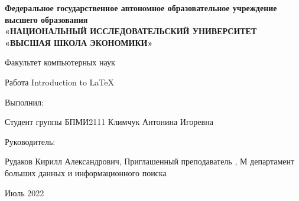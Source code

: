\documentclass{report}
\begin{document}
\begin{titlepage}
    \newpage
    \begin{center}
    {\bfseries Федеральное государственное автономное образовательное учреждение высшего образования  \\
    \vspace{0,5cm}
    «НАЦИОНАЛЬНЫЙ ИССЛЕДОВАТЕЛЬСКИЙ УНИВЕРСИТЕТ
    «ВЫСШАЯ ШКОЛА ЭКОНОМИКИ»
     
     \vspace{0,5cm}
     Факультет компьютерных наук
    }
    \vspace{3cm}

    
    \Large Работа\linebreak
    Introduction to LaTeX \linebreak
    \end{center}

    \vspace{5em}

   
     \hspace{70mm} 
                     Выполнил:
   
    \begin{flushright}
    Студент группы БПМИ2111 Климчук Антонина Игоревна
    \end{flushright}

    \hspace{70mm} 
    Руководитель: 
    \begin{flushright}
    Рудаков Кирилл Александрович, Приглашенный преподаватель , М департамент больших данных и информационного поиска

    \end{flushright}
     \vspace{5cm}

    \begin{center}
    Июль 2022
    \end{center}

\end{titlepage}
    
 
\end{document}
